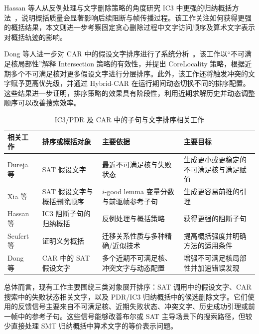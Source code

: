 \documentclass[11pt,a4paper]{article}
\begin{document}
Hassan 等人从反例处理与文字删除策略的角度研究 IC3 中更强的归纳概括方法~\cite{hassan2013better}，说明概括质量会显著影响后续阻断与帧传播过程。该工作关注如何获得更强的概括结果，本文则进一步考察固定贪心删除过程中文字访问顺序及算术文字表示对概括轨迹的影响。

Dong 等人进一步对 CAR 中的假设文字排序进行了系统分析~\cite{dong2025revisiting}。该工作以“不可满足核局部性”解释 Intersection 策略的有效性，并提出 CoreLocality 策略，根据近期多个不可满足核对更多假设文字进行分层排序。此外，该工作还将触发冲突的文字赋予更高优先级，并通过 Hybrid-CAR 在运行期间动态切换不同的排序配置。这些结果进一步证明，排序策略的效果具有阶段性，利用近期求解历史并动态调整顺序可以改善搜索效率。

\begin{table}[htbp]
  \centering
  \caption{IC3/PDR 及 CAR 中的子句与文字排序相关工作}
  \label{tab:related-ordering}
  \small
  \renewcommand{\arraystretch}{1.2}
  \begin{tabularx}{\textwidth}{>{\raggedright\arraybackslash}p{2.5cm} >{\raggedright\arraybackslash}p{2.8cm} >{\raggedright\arraybackslash}p{4.1cm} X}
    \toprule
    相关工作 & 排序或概括对象 & 主要依据 & 主要目标 \\
    \midrule
    Dureja 等~\cite{dureja2020intersection} & SAT 假设文字 & 最近不可满足核与失败状态 & 生成更小或更稳定的不可满足核与满足赋值 \\
    Xia 等~\cite{xia2023igood} & SAT 假设文字与概括删除顺序 & $i$-good lemma 变量分数与前驱帧参考子句 & 生成更容易前推的引理 \\
    Hassan 等~\cite{hassan2013better} & IC3 阻断子句的归纳概括 & 反例处理与概括策略 & 获得更强的阻断子句 \\
    Seufert 等~\cite{seufert2022generalization} & 证明义务概括 & 迁移关系性质与多种精确/近似技术 & 提高概括强度并明确方法的适用条件 \\
    Dong 等~\cite{dong2025revisiting} & CAR 中的 SAT 假设文字 & 多个近期不可满足核、冲突文字与动态配置 & 增强不可满足核局部性并加速错误发现 \\
    \bottomrule
  \end{tabularx}
\end{table}

总体而言，现有工作主要围绕三类对象展开排序：SAT 调用中的假设文字、CAR 搜索中的失败状态相关文字，以及 PDR/IC3 归纳概括中的候选删除文字。它们使用的反馈信号主要来自不可满足核、近期失败状态、冲突文字、历史成功引理或前一帧中的参考子句。这些信号能够改善布尔或 SAT 主导场景下的搜索路径，但较少直接处理 SMT 归纳概括中算术文字的等价表示问题。
\end{document}
